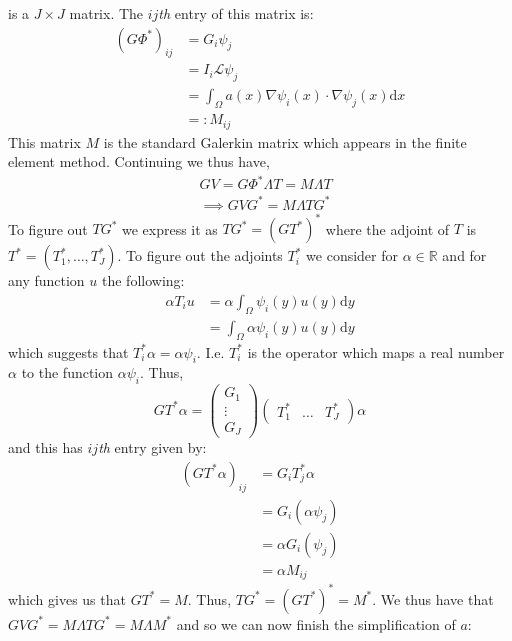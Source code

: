 \documentclass{article}
\theoremstyle{definition}
\theoremstyle{remark}
\begin{document}
is a $J\times J$ matrix. The $ij$\textit{th} entry of this matrix is:
\begin{align*}
    (G\Phi^{*})_{ij}&=G_{i}\psi_{j} \\
    &=I_{i}\mathcal{L}\psi_{j} \\
    &=\int_{\Omega}a(x)\nabla\psi_{i}(x)\cdot\nabla\psi_{j}(x)\mathrm{d}x \\
    &=:M_{ij}
\end{align*}
This matrix $M$ is the standard Galerkin matrix which appears in the finite element method. Continuing we thus have,
\begin{align*}
    &GV=G\Phi^{*}\Lambda T = M\Lambda T \\
    &\implies GVG^{*}=M\Lambda TG^{*}
\end{align*}
To figure out $TG^{*}$ we express it as $TG^{*}=(GT^{*})^{*}$ where the adjoint of $T$ is $T^{*}=(T_1^{*},\dots,T_{J}^{*})$. To figure out the adjoints $T_i^{*}$ we consider for $\alpha\in\mathbb{R}$ and for any function $u$ the following:
\begin{align*}
    \alpha T_{i}u &= \alpha\int_{\Omega}\psi_{i}(y)u(y)\mathrm{d}y \\
    &=\int_{\Omega}\alpha\psi_{i}(y)u(y)\mathrm{d}y
\end{align*}
which suggests that $T_{i}^{*}\alpha=\alpha\psi_{i}$. I.e. $T_{i}^{*}$ is the operator which maps a real number $\alpha$ to the function $\alpha\psi_{i}$. Thus,
\begin{equation*}
    GT^{*}\alpha=\begin{pmatrix}
                G_1 \\
                \vdots \\
                G_{J}
              \end{pmatrix} \begin{pmatrix}
                                T_1^{*} & \hdots & T_{J}^{*}
                            \end{pmatrix}\alpha
\end{equation*}
and this has $ij$\textit{th} entry given by:
\begin{align*}
    (GT^{*}\alpha)_{ij}&=G_{i}T_{j}^{*}\alpha \\
    &=G_{i}(\alpha\psi_{j}) \\
    &=\alpha G_{i}(\psi_{j}) \\
    &=\alpha M_{ij}
\end{align*}
which gives us that $GT^{*}=M$. Thus, $TG^{*}=(GT^{*})^{*}=M^{*}$. We thus have that $GVG^{*}=M\Lambda TG^{*}=M\Lambda M^{*}$ and so we can now finish the simplification of $a$:
\end{document}
